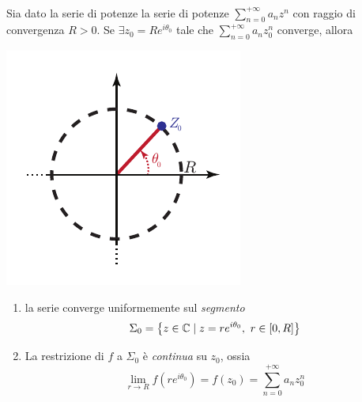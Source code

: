 \begin{theorema}~{}\\
	Sia dato la serie di potenze la serie di potenze $\displaystyle\sum_{n=0}^{+\infty}a_nz^n$ con raggio di convergenza $R>0$. Se $\exists z_0=Re^{i\theta_0}$ tale che $\displaystyle\sum_{n=0}^{+\infty}a_nz_0^n$ converge, allora\\
	\begin{minipage}{0.39\textwidth}
		\includegraphics[trim=0cm 0cm 0cm 0cm, clip, scale=1]{images/discoconvergenzaabel.pdf}
	\end{minipage}\hspace{-12mm}
	\begin{minipage}{0.65\textwidth}
\begin{enumerate}
	\item la serie converge uniformemente sul \textit{segmento}
	\begin{equation}
		\Sigma_0=\left\{z\in\mathbb{C}\mid z=re^{i\theta_0},\ r\in\left[0,R\right]\right\}
	\end{equation}
	\item La restrizione di $f$ a $\Sigma_0$ è \textit{continua} su $z_0$, ossia
	\begin{equation}
		\lim_{r\to R}f\left(re^{i\theta_0}\right)=f\left(z_0\right)=\sum_{n=0}^{+\infty}a_nz_0^n
	\end{equation}
\end{enumerate}
	\end{minipage}
\end{theorema}
